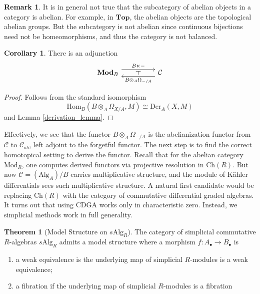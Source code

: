 \documentclass{article}
\newcommand{\Hom}{\textrm{Hom}}
\newcommand{\Der}{\textrm{Der}}
\theoremstyle{definition}
\newtheorem{theorem}{Theorem}[section]
\theoremstyle{definition}
\theoremstyle{definition}
\newtheorem{remark}{Remark}[theorem]
\theoremstyle{definition}
\theoremstyle{definition}
\theoremstyle{definition}
\newtheorem{corollary}{Corollary}[theorem]
\theoremstyle{definition}
\begin{document}
\begin{remark}
	It is in general not true that the subcategory of abelian objects in a category is abelian. For example, in $\textbf{Top}$, the abelian objects are the topological abelian groups. But the subcategory is not abelian since continuous bijections need not be homeomorphisms, and thus the category is not balanced.
\end{remark}
\begin{corollary}
	\label{abelianization_adjunction}
	There is an adjunction
\[\begin{tikzcd} 
	{\textbf{Mod}_B} && {\mathcal{C}} 
	\arrow["{B\ltimes -}"', shift left=2,swap, from=1-1, to=1-3] 
	\arrow["{B\otimes_A \Omega_{-/A}}"', shift left=2,swap, from=1-3, to=1-1]
\arrow[phantom,from=1-1, to=1-3, "\dashv" rotate=90]
 \end{tikzcd}\]
\end{corollary}
\begin{proof}
	
	
	
	Follows from the standard isomorphism 
	\[\Hom_B(B\otimes_A \Omega_{X/A}, M)\cong \Der_A(X,M)\]
	and Lemma \ref{derivation_lemma}.
\end{proof}
Effectively, we see that the functor $B\otimes_A \Omega_{-/A}$ is the abelianization functor from $\mathcal{C}$ to $\mathcal{C}_{ab}$, left adjoint to the forgetful functor. The next step is to find the correct homotopical setting to derive the functor. Recall that for the abelian category $\textrm{Mod}_R$, one computes derived functors via projective resolution in $\textrm{Ch}(R)$. But now $\mathcal{C}=(\textrm{Alg}_A)/B$ carries multiplicative structure, and the module of K\"ahler differentials sees such multiplicative structure. A natural first candidate would be replacing $\textrm{Ch}(R)$ with the category of commutative differential graded algebras. It turns out that using $\textrm{CDGA}$ works only in characteristic zero. Instead, we simplicial methods work in full generality.


\begin{theorem}[Model Structure on $s \textrm{Alg}_R$]
	The category of simplicial commutative $R$-algebras $s\textrm{Alg}_R$ admits a model structure where a morphism $f: A_{\bullet}\to B_{\bullet}$ is 
	\begin{enumerate}
		\item a weak equivalence is the underlying map of simplicial $R$-modules is a weak equivalence;
		\item a fibration if the underlying map of simplicial $R$-modules is a fibration
	\end{enumerate}
	
\end{theorem}
\end{document}
